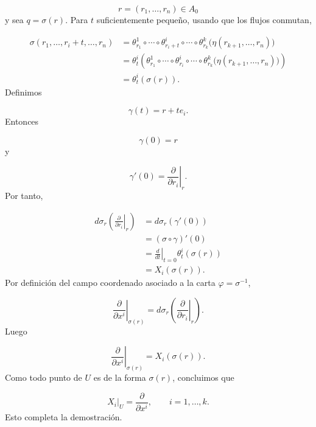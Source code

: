 \begin{bookproof}{}
\[
r=(r_1,\ldots,r_n)\in A_0
\]
y sea $q=\sigma(r)$. Para $t$ suficientemente pequeño, usando que los flujos conmutan,

\[
\begin{aligned}\sigma(r_1,\ldots,r_i+t,\ldots,r_n)&=\theta_{r_1}^1\circ\cdots\circ\theta_{r_i+t}^i\circ\cdots\circ\theta_{r_k}^k\bigl(\eta(r_{k+1},\ldots,r_n)\bigr)\\&=\theta_t^i\left(\theta_{r_1}^1\circ\cdots\circ\theta_{r_i}^i\circ\cdots\circ\theta_{r_k}^k\bigl(\eta(r_{k+1},\ldots,r_n)\bigr)\right)\\&=\theta_t^i(\sigma(r)).\end{aligned}
\]
Definimos

\[
\gamma(t)=r+te_i.
\]
Entonces

\[
\gamma(0)=r
\]
y

\[
\gamma'(0)=\left.\frac{\partial}{\partial r_i}\right|_r.
\]
Por tanto,

\[
\begin{aligned}d\sigma_r\left(\left.\frac{\partial}{\partial r_i}\right|_r\right)&=d\sigma_r(\gamma'(0))\\&=(\sigma\circ\gamma)'(0)\\&=\left.\frac{d}{dt}\right|_{t=0}\theta_t^i(\sigma(r))\\&=X_i(\sigma(r)).\end{aligned}
\]
Por definición del campo coordenado asociado a la carta $\varphi=\sigma^{-1}$,

\[
\left.\frac{\partial}{\partial x^i}\right|_{\sigma(r)}=d\sigma_r\left(\left.\frac{\partial}{\partial r_i}\right|_r\right).
\]
Luego

\[
\left.\frac{\partial}{\partial x^i}\right|_{\sigma(r)}=X_i(\sigma(r)).
\]
Como todo punto de $U$ es de la forma $\sigma(r)$, concluimos que

\[
X_i|_U=\frac{\partial}{\partial x^i},\qquad i=1,\ldots,k.
\]
Esto completa la demostración.

\bookqed
\end{bookproof}
